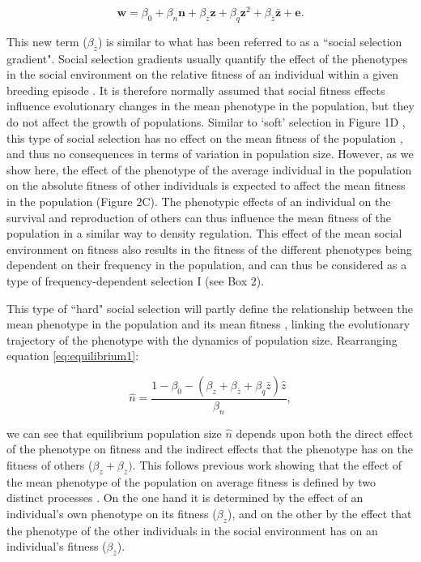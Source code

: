 \documentclass{article}
\begin{document}
\begin{equation} \label{eq: socialselection}
\bm{w}=\beta_{0} +\beta_{n} \bm{n} + \beta_{z} \bm{z} + \beta_{q} \bm{z}^2 + \beta_{\bar{z}} \bar{\bm{z}}+ \bm{e}.
\end{equation}

This new term ($\beta_{\bar{z}}$) is similar to what has been referred to as a “social selection gradient". Social selection gradients usually quantify the effect of the phenotypes in the social environment on the relative fitness of an individual within a given breeding episode \citep{Wolf1999SocialSelection}. It is therefore normally assumed that social fitness effects influence evolutionary changes in the mean phenotype in the population, but they do not affect the growth of populations. Similar to `soft' selection in Figure 1D \citep{Wallace1975, Bell2021}, this type of social selection has no effect on the mean fitness of the population \citep{Goodnight1992}, and thus no consequences in terms of variation in population size. However, as we show here, the effect of the phenotype of the average individual in the population on the absolute fitness of other individuals is expected to affect the mean fitness in the population (Figure 2C). The phenotypic effects of an individual on the survival and reproduction of others can thus influence the mean fitness of the population in a similar way to density regulation. This effect of the mean social environment on fitness also results in the fitness of the different phenotypes being dependent on their frequency in the population, and can thus be considered as a type of frequency-dependent selection I (see Box 2). 

This type of “hard" social selection will partly define the relationship between the mean phenotype in the population and its mean fitness \citep{Lande1976}, linking the evolutionary trajectory of the phenotype with the dynamics of population size. Rearranging equation \ref{eq:equilibrium1}:

\begin{equation}
\hat{n} = \frac{1-\beta_{0} - (\beta_{z} + \beta_{\bar{z}} +  \beta_{q}\bar{z})\hat{z}}{\beta_{n}},
\end{equation}

\noindent we can see that equilibrium population size $\hat{n}$ depends upon both the direct effect of the phenotype on fitness and the indirect effects that the phenotype has on the fitness of others ($\beta_{z} + \beta_{\bar{z}})$. This follows previous work showing that the effect of the mean phenotype of the population on average fitness is defined by two distinct processes \citep{Engen2020, Lande2007, Lande1976}. On the one hand it is determined by the effect of an individual's own phenotype on its fitness ($\beta_{z}$), and on the other by the effect that the phenotype of the other individuals in the social environment has on an individual's fitness ($\beta_{\bar{z}}$).
\end{document}
